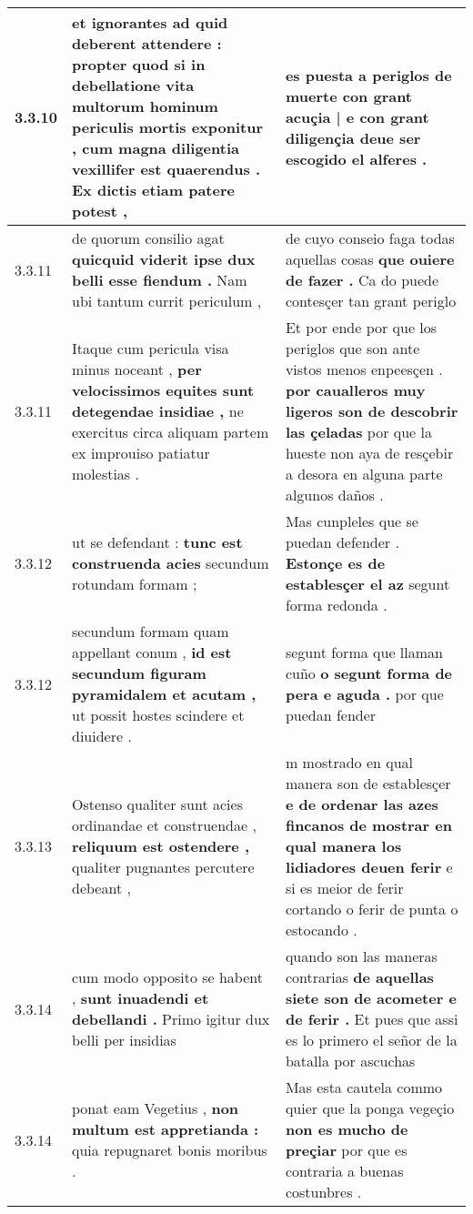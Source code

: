 \begin{tabular}{|p{1cm}|p{6.5cm}|p{6.5cm}|}
3.3.10 & et ignorantes ad quid deberent attendere : propter quod si in debellatione vita multorum hominum periculis mortis exponitur , \textbf{ cum magna diligentia vexillifer est quaerendus . } Ex dictis etiam patere potest , & es puesta a periglos de muerte \textbf{ con grant acuçia | e con grant diligençia } deue ser escogido el alferes . \\\hline
3.3.11 & de quorum consilio agat \textbf{ quicquid viderit ipse dux belli esse fiendum . } Nam ubi tantum currit periculum , & de cuyo conseio faga todas aquellas cosas \textbf{ que ouiere de fazer . } Ca do puede contesçer tan grant periglo \\\hline
3.3.11 & Itaque cum pericula visa minus noceant , \textbf{ per velocissimos equites sunt detegendae insidiae , } ne exercitus circa aliquam partem ex improuiso patiatur molestias . & Et por ende por que los periglos que son ante vistos menos enpeesçen . \textbf{ por caualleros muy ligeros son de descobrir las çeladas } por que la hueste non aya de resçebir a desora en alguna parte algunos daños . \\\hline
3.3.12 & ut se defendant : \textbf{ tunc est construenda acies } secundum rotundam formam ; & Mas cunpleles que se puedan defender . \textbf{ Estonçe es de establesçer el az } segunt forma redonda . \\\hline
3.3.12 & secundum formam quam appellant conum , \textbf{ id est secundum figuram pyramidalem et acutam , } ut possit hostes scindere et diuidere . & segunt forma que llaman cuño \textbf{ o segunt forma de pera e aguda . } por que puedan fender \\\hline
3.3.13 & Ostenso qualiter sunt acies ordinandae et construendae , \textbf{ reliquum est ostendere , } qualiter pugnantes percutere debeant , & m mostrado en qual manera son de establesçer \textbf{ e de ordenar las azes fincanos de mostrar en qual manera los lidiadores deuen ferir } e si es meior de ferir cortando o ferir de punta o estocando . \\\hline
3.3.14 & cum modo opposito se habent , \textbf{ sunt inuadendi et debellandi . } Primo igitur dux belli per insidias & quando son las maneras contrarias \textbf{ de aquellas siete son de acometer e de ferir . } Et pues que assi es lo primero el señor de la batalla por ascuchas \\\hline
3.3.14 & ponat eam Vegetius , \textbf{ non multum est appretianda : } quia repugnaret bonis moribus . & Mas esta cautela commo quier que la ponga vegeçio \textbf{ non es mucho de preçiar } por que es contraria a buenas costunbres . \\\hline

\end{tabular}
